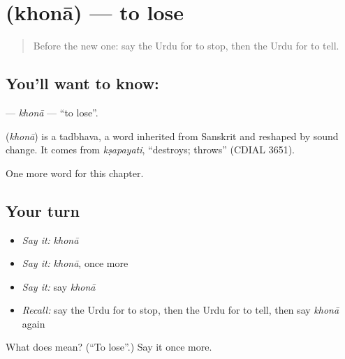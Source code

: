 \section[\texorpdfstring{\ur{کھونا} (khonā)}{کھونا (khonā)}]{ (khonā) — to lose}

\label{lesson:UR-C52-khona}



\begin{quote}
Before the new one: say the Urdu for to stop, then the Urdu for to tell.
\end{quote}

\subsection*{You'll want to know: }
\textbf{} — \emph{khonā} — \textquotedblleft{}to lose\textquotedblright{}.

\begin{cousinweb}
\textbf{} (\emph{khonā}) is a tadbhava, a word inherited from Sanskrit and reshaped by sound change. It comes from \emph{kṣapayati}, \textquotedblleft{}destroys; throws\textquotedblright{} (CDIAL 3651).
\end{cousinweb}

\begin{grammarlens}[title={What you've built}]
One more word for this chapter.
\end{grammarlens}

\subsection*{Your turn}
\begin{itemize}
\raggedright
  \item \emph{Say it:} \emph{khonā}
  \item \emph{Say it:} \emph{khonā}, once more
  \item \emph{Say it:} say \emph{khonā}
  \item \emph{Recall:} say the Urdu for to stop, then the Urdu for to tell, then say \emph{khonā} again
\end{itemize}

\begin{tcolorbox}[breakable,colback=teal!4,colframe=teal!35!black,title={Before you move on}]
What does  mean? (\textquotedblleft{}To lose\textquotedblright{}.) Say it once more.
\end{tcolorbox}
